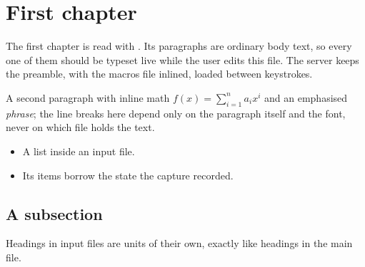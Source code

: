 \section{First chapter}\label{sec:one}
The first chapter is read with \verb||. Its paragraphs are ordinary body text, so every one of them should be typeset live while the user edits this file. The \project{} server keeps the preamble, with the macros file inlined, loaded between keystrokes.

A second paragraph with inline math $f(x) = \sum_{i=1}^{n} a_i x^i$ and an emphasised \emph{phrase}; the line breaks here depend only on the paragraph itself and the font, never on which file holds the text.

\begin{itemize}
  \item A list inside an input file.
  \item Its items borrow the  state the capture recorded.
\end{itemize}

\subsection{A subsection}
Headings in input files are units of their own, exactly like headings in the main file.
